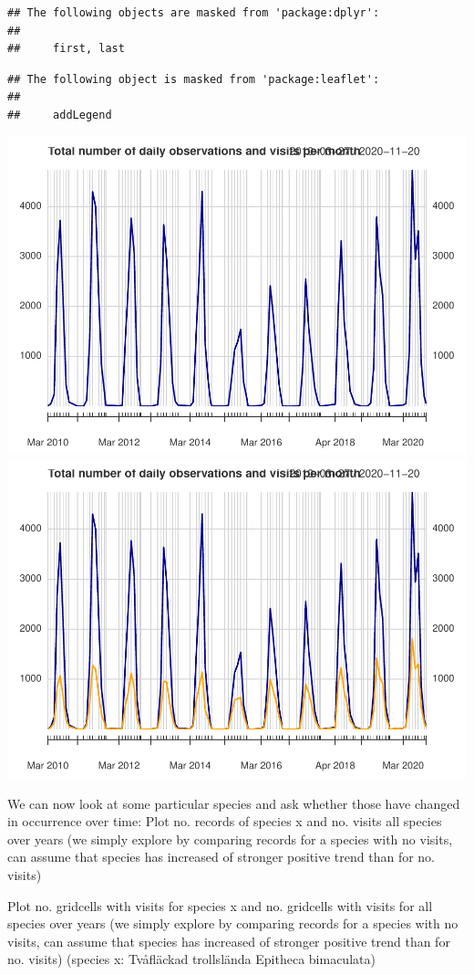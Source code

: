 \documentclass[
  10pt,
]{article}
\begin{document}
\begin{verbatim}
## The following objects are masked from 'package:dplyr':
## 
##     first, last
\end{verbatim}

\begin{verbatim}
## The following object is masked from 'package:leaflet':
## 
##     addLegend
\end{verbatim}

\includegraphics{r-tools-tutorial_files/figure-latex/monthlyPlot-1.pdf} \includegraphics{r-tools-tutorial_files/figure-latex/monthlyPlot-2.pdf}

We can now look at some particular species and ask whether those have changed in occurrence over time:
Plot no. records of species x and no. visits all species over years (we simply explore by comparing records for a species with no visits, can assume that species has increased of stronger positive trend than for no. visits)

Plot no. gridcells with visits for species x and no. gridcells with visits for all species over years (we simply explore by comparing records for a species with no visits, can assume that species has increased of stronger positive trend than for no. visits)
(species x: Tvåfläckad trollslända Epitheca bimaculata)

  
\end{document}
